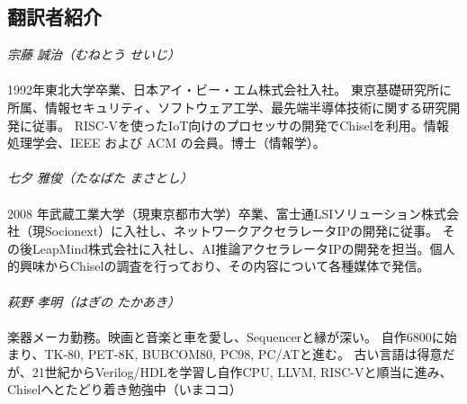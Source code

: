 \begin{minipage}{100mm}
\begin{spacing}{1.0}
\subsection*{翻訳者紹介}
\vspace{1mm}
\noindent
\emph{宗藤 誠治（むねとう せいじ）}
\\
\\[-3mm]
{\small
1992年東北大学卒業、日本アイ・ビー・エム株式会社入社。
東京基礎研究所に所属、情報セキュリティ、ソフトウェア工学、最先端半導体技術に関する研究開発に従事。
RISC-Vを使ったIoT向けのプロセッサの開発でChiselを利用。情報処理学会、IEEE および ACM の会員。博士（情報学）。
}
\\
\\[-1mm]
\noindent
\emph{七夕 雅俊（たなばた まさとし）}
\\
\\[-3mm]
{\small
2008 年武蔵工業大学（現東京都市大学）卒業、富士通LSIソリューション株式会社（現Socionext）に入社し、ネットワークアクセラレータIPの開発に従事。
その後LeapMind株式会社に入社し、AI推論アクセラレータIPの開発を担当。個人的興味からChiselの調査を行っており、その内容について各種媒体で発信。
}
\\
\\[-1mm]
\noindent
\emph{萩野 孝明（はぎの たかあき）}
\\
\\[-3mm]
{\small
楽器メーカ勤務。映画と音楽と車を愛し、Sequencerと縁が深い。
自作6800に始まり、TK-80, PET-8K, BUBCOM80, PC98, PC/ATと進む。
古い言語は得意だが、21世紀からVerilog/HDLを学習し自作CPU, LLVM, RISC-Vと順当に進み、Chiselへとたどり着き勉強中（いまココ）
}


\end{spacing}\end{minipage}

\clearpage

